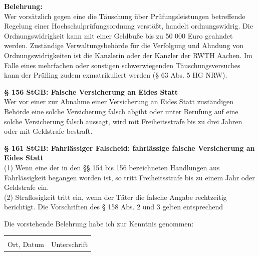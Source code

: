 \documentclass[12pt, a4paper, oneside]{article}
\begin{document}
\begin{small}
	\textbf{Belehrung:}\\
	Wer vorsätzlich gegen eine die Täuschung über Prüfungsleistungen betreffende Regelung einer Hochschulprüfungsordnung verstößt, handelt ordnungswidrig. Die Ordnungswidrigkeit kann mit einer Geldbuße bis zu 50 000 Euro geahndet werden. Zuständige Verwaltungsbehörde für die Verfolgung und Ahndung von Ordnungswidrigkeiten ist die Kanzlerin oder der Kanzler der RWTH Aachen. Im Falle eines mehrfachen oder sonstigen schwerwiegenden Täuschungsversuches kann der Prüfling zudem exmatrikuliert werden (§ 63 Abs. 5 HG NRW).
	
	\textbf{§ 156 StGB: Falsche Versicherung an Eides Statt}\\
	Wer vor einer zur Abnahme einer Versicherung an Eides Statt zuständigen Behörde eine solche Versicherung falsch abgibt oder unter Berufung auf eine solche Versicherung falsch aussagt, wird mit Freiheitsstrafe bis zu drei Jahren oder mit Geldstrafe bestraft.
	
	\textbf{§ 161 StGB: Fahrlässiger Falscheid; fahrlässige falsche Versicherung an Eides Statt}\\
	(1) Wenn eine der in den §§ 154 bis 156 bezeichneten Handlungen aus Fahrlässigkeit begangen worden ist, so tritt Freiheitsstrafe bis zu einem Jahr oder Geldstrafe ein.\\
	(2) Straflosigkeit tritt ein, wenn der Täter die falsche Angabe rechtzeitig berichtigt. Die Vorschriften des § 158 Abs. 2 und 3 gelten entsprechend
\end{small}

\vspace{0.6cm}

Die vorstehende Belehrung habe ich zur Kenntnis genommen:

\vspace{0.6cm}

\begin{tabular}{@{}p{8cm}p{5.8cm}}
	\underline{\smash{Aachen, den \today}} & \underline{\hspace{5.8cm}}\\
	Ort, Datum & Unterschrift \\
\end{tabular}

\endgroup
\clearpage
	
\end{document}
